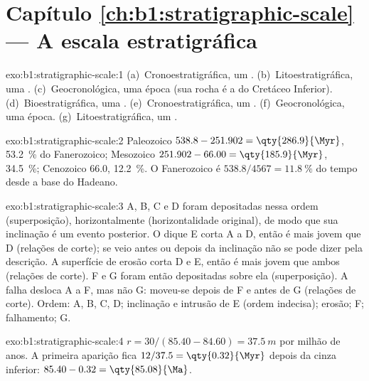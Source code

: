\section*{Capítulo \ref{ch:b1:stratigraphic-scale} --- A escala estratigráfica}

\begin{solution}{exo:b1:stratigraphic-scale:1}
(a)~Cronoestratigráfica, um . (b)~Litoestratigráfica, uma .
(c)~Geocronológica, uma época (sua rocha é a  do Cretáceo Inferior).
(d)~Bioestratigráfica, uma . (e)~Cronoestratigráfica, um .
(f)~Geocronológica, uma época. (g)~Litoestratigráfica, um .
\end{solution}

\begin{solution}{exo:b1:stratigraphic-scale:2}
Paleozoico $538.8 - 251.902 = \qty{286.9}{\Myr}$, \qty{53.2}{\%} do
Fanerozoico; Mesozoico $251.902 - 66.00 = \qty{185.9}{\Myr}$, \qty{34.5}{\%};
Cenozoico \qty{66.0}{\Myr}, \qty{12.2}{\%}. O Fanerozoico é
$538.8/4567 = \qty{11.8}{\%}$ do tempo desde a base do Hadeano.
\end{solution}

\begin{solution}{exo:b1:stratigraphic-scale:3}
A, B, C e D foram depositadas nessa ordem (superposição), horizontalmente (horizontalidade
original), de modo que sua inclinação é um evento posterior. O dique E corta A a D, então é
mais jovem que D (relações de corte); se veio antes ou depois da inclinação não se pode dizer
pela descrição. A superfície de erosão corta D e E, então é mais jovem que ambos (relações de
corte). F e G foram então depositadas sobre ela (superposição). A falha desloca A a F, mas não
G: moveu-se depois de F e antes de G (relações de corte). Ordem: A, B, C, D; inclinação e
intrusão de E (ordem indecisa); erosão; F; falhamento; G.
\end{solution}

\begin{solution}{exo:b1:stratigraphic-scale:4}
$r = 30/(85.40 - 84.60) = \qty{37.5}{m}$ por milhão de anos. A primeira aparição
fica $12/37.5 = \qty{0.32}{\Myr}$ depois da cinza inferior: $85.40 - 0.32 =
\qty{85.08}{\Ma}$.
\end{solution}

